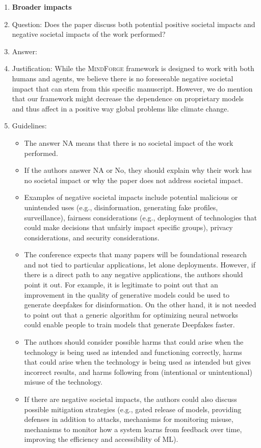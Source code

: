 \documentclass{article}
\newcommand{\collabvoyager}[0]{\mbox{\textsc{MindForge}}\xspace}
\begin{document}
\begin{enumerate}
\item {\bf Broader impacts}
    \item[] Question: Does the paper discuss both potential positive societal impacts and negative societal impacts of the work performed?
    \item[] Answer: \answerNo{}
    \item[] Justification:  While the \collabvoyager framework is designed to work with both humans and agents, we believe there is no foreseeable negative societal impact that can stem from this specific manuscript. However, we do mention that our framework might decrease the dependence on proprietary models and thus affect in a positive way global problems like climate change.
    \item[] Guidelines:
    \begin{itemize}
        \item The answer NA means that there is no societal impact of the work performed.
        \item If the authors answer NA or No, they should explain why their work has no societal impact or why the paper does not address societal impact.
        \item Examples of negative societal impacts include potential malicious or unintended uses (e.g., disinformation, generating fake profiles, surveillance), fairness considerations (e.g., deployment of technologies that could make decisions that unfairly impact specific groups), privacy considerations, and security considerations.
        \item The conference expects that many papers will be foundational research and not tied to particular applications, let alone deployments. However, if there is a direct path to any negative applications, the authors should point it out. For example, it is legitimate to point out that an improvement in the quality of generative models could be used to generate deepfakes for disinformation. On the other hand, it is not needed to point out that a generic algorithm for optimizing neural networks could enable people to train models that generate Deepfakes faster.
        \item The authors should consider possible harms that could arise when the technology is being used as intended and functioning correctly, harms that could arise when the technology is being used as intended but gives incorrect results, and harms following from (intentional or unintentional) misuse of the technology.
        \item If there are negative societal impacts, the authors could also discuss possible mitigation strategies (e.g., gated release of models, providing defenses in addition to attacks, mechanisms for monitoring misuse, mechanisms to monitor how a system learns from feedback over time, improving the efficiency and accessibility of ML).
    \end{itemize}
    

\end{enumerate}
\end{document}
